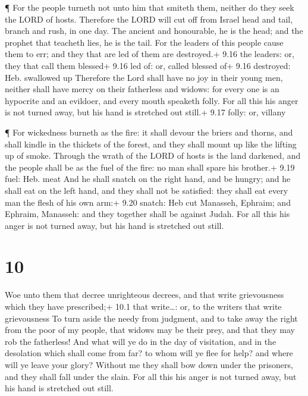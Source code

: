  ¶ For the people turneth not unto him that smiteth them,
neither do they seek the LORD of hosts.  Therefore the LORD
will cut off from Israel head and tail, branch and rush, in one day.
 The ancient and honourable, he is the head; and the
prophet that teacheth lies, he is the tail.  For the
leaders of this people cause them to err; and they that are led of them
are destroyed.+ 9.16 the leaders: or, they that call them blessed+ 9.16
led of: or, called blessed of+ 9.16 destroyed: Heb. swallowed up
 Therefore the Lord shall have no joy in their young men,
neither shall have mercy on their fatherless and widows: for every one
is an hypocrite and an evildoer, and every mouth speaketh folly. For all
this his anger is not turned away, but his hand is stretched out still.+
9.17 folly: or, villany

 ¶ For wickedness burneth as the fire: it shall devour the
briers and thorns, and shall kindle in the thickets of the forest, and
they shall mount up like the lifting up of smoke.  Through
the wrath of the LORD of hosts is the land darkened, and the people
shall be as the fuel of the fire: no man shall spare his brother.+ 9.19
fuel: Heb. meat  And he shall snatch on the right hand, and
be hungry; and he shall eat on the left hand, and they shall not be
satisfied: they shall eat every man the flesh of his own arm:+ 9.20
snatch: Heb cut  Manasseh, Ephraim; and Ephraim, Manasseh:
and they together shall be against Judah. For all this his anger is not
turned away, but his hand is stretched out still.

\hypertarget{section-9}{%
\section{10}\label{section-9}}

 Woe unto them that decree unrighteous decrees, and that
write grievousness which they have prescribed;+ 10.1 that write\ldots:
or, to the writers that write grievousness  To turn aside
the needy from judgment, and to take away the right from the poor of my
people, that widows may be their prey, and that they may rob the
fatherless!  And what will ye do in the day of visitation,
and in the desolation which shall come from far? to whom will ye flee
for help? and where will ye leave your glory?  Without me
they shall bow down under the prisoners, and they shall fall under the
slain. For all this his anger is not turned away, but his hand is
stretched out still.

